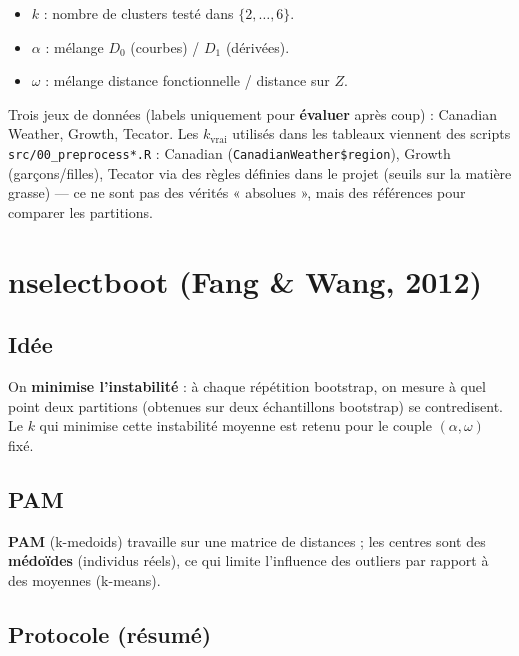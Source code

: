 \documentclass[11pt, a4paper]{article}
\begin{document}
\begin{itemize}
  \item \textbf{$k$} : nombre de clusters testé dans $\{2,\ldots,6\}$.
  \item \textbf{$\alpha$} : mélange $D_0$ (courbes) / $D_1$ (dérivées).
  \item \textbf{$\omega$} : mélange distance fonctionnelle / distance sur $Z$.
\end{itemize}

Trois jeux de données (labels uniquement pour \textbf{évaluer} après coup) :
Canadian Weather, Growth, Tecator. Les $k_{\mathrm{vrai}}$ utilisés dans les
tableaux viennent des scripts \texttt{src/00\_preprocess*.R} : Canadian
(\texttt{CanadianWeather\$region}), Growth (garçons/filles), Tecator
via des règles définies dans le projet (seuils sur la matière grasse)
--- ce ne sont pas des vérités « absolues », mais des références pour comparer les
partitions.

\section{nselectboot (Fang \& Wang, 2012)}

\subsection{Idée}

On \textbf{minimise l'instabilité} : à chaque répétition bootstrap, on mesure à quel
point deux partitions (obtenues sur deux échantillons bootstrap) se contredisent.
Le $k$ qui minimise cette instabilité moyenne est retenu pour le couple
$(\alpha,\omega)$ fixé.

\subsection{PAM}

\textbf{PAM} (k-medoids) travaille sur une matrice de distances ; les centres sont
des \textbf{médoïdes} (individus réels), ce qui limite l'influence des outliers
par rapport à des moyennes (k-means).

\subsection{Protocole (résumé)}
\end{document}
